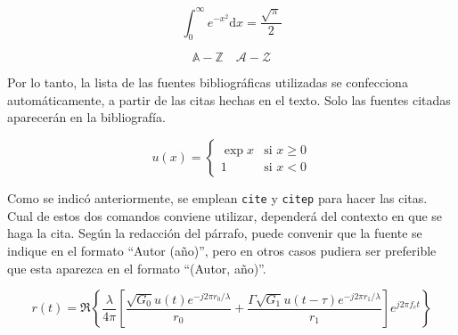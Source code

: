 \begin{equation}
\int_0^\infty e^{-x^2} \mathrm{d}x = \frac{\sqrt{\pi}}{2}
\end{equation}

\begin{equation}
\mathbb{A-Z} \quad 
\mathcal{A-Z}
\end{equation}

Por lo tanto, la lista de las fuentes bibliográficas utilizadas se confecciona automáticamente, a partir de las citas hechas en el texto.  Solo las fuentes citadas aparecerán en la bibliografía.

\begin{equation}
u(x) = 
  \begin{cases} 
   \exp{x} & \text{si } x \geq 0 \\
   1       & \text{si } x < 0
  \end{cases}
\end{equation}

Como se indicó anteriormente, se emplean \texttt{cite} y \texttt{citep} para hacer las citas.  Cual de estos dos comandos conviene utilizar, dependerá del contexto en que se haga la cita.  Según la redacción del párrafo, puede convenir que la fuente se indique en el formato ``Autor (año)'', pero en otros casos pudiera ser preferible que esta aparezca en el formato ``(Autor, año)''.

\begin{equation}
r(t) = \Re \left\lbrace \frac{\lambda}{4\pi} \left[ \frac{\sqrt{G_0} u(t) e^{-j2\pi r_0/\lambda}}{r_0} + \frac{\Gamma \sqrt{G_1} u(t-\tau) e^{-j2\pi r_1/\lambda}}{r_1} \right] e^{j2\pi f_c t}  \right\rbrace
\end{equation}